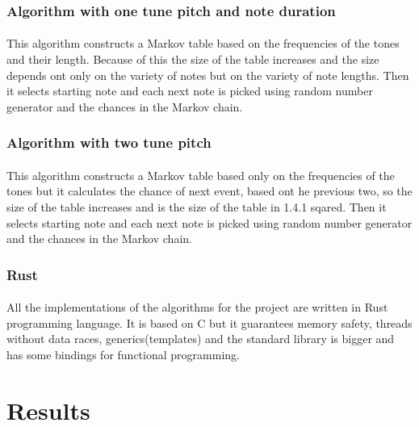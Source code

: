 \documentclass[]{article}
\begin{document}
            \subsubsection{Algorithm with one tune pitch and note duration}
            \paragraph{}This algorithm constructs a Markov table based on the frequencies of the tones and their length. Because of this the size of the table increases and the size depends ont only on the variety of notes but on the variety of note lengths. Then it selects starting note and each next note is picked using random number generator and the chances in the Markov chain.
            \subsubsection{Algorithm with two tune pitch}
            \paragraph{}This algorithm constructs a Markov table based only on the frequencies of the tones but it calculates the chance of next event, based ont he previous two, so the size of the table increases and is the size of the table in 1.4.1 sqared. Then it selects starting note and each next note is picked using random number generator and the chances in the Markov chain.
            \subsubsection{Rust}
            \paragraph{}All the implementations of the algorithms for the project are written in Rust programming language\cite{rust}. It is based on C but it guarantees memory safety, threads without data races, generics(templates) and the standard library is bigger and has some bindings for functional programming.
    \section{Results}
\end{document}
